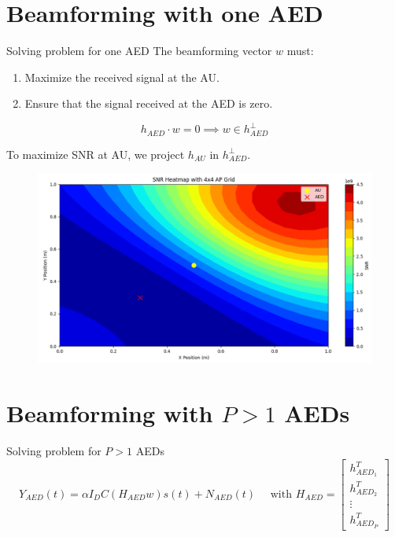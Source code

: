 \documentclass[aspectratio=169,xcolor=dvipsnames]{beamer}
\begin{document}
	\section{Beamforming with one AED}
	
	\begin{frame}{Solving problem for one AED}
		The beamforming vector \( w \) must:
		\begin{enumerate}
			\item Maximize the received signal at the AU.
			\item Ensure that the signal received at the AED is zero.
		\end{enumerate}
		
		\begin{equation}
			h_{AED} \cdot w = 0 \implies w \in h_{AED}^\perp
		\end{equation}
		
		To maximize SNR at AU, we project $h_{AU}$ in $h_{AED}^\perp$.
		
		\begin{figure}[h!]
			\centering
			\includegraphics[width=.5\textwidth]{../../oneAED.PNG}
		\end{figure}
	\end{frame}
	
	\section{Beamforming with $P>1$ AEDs}
	
	\begin{frame}{Solving problem for $P > 1$ AEDs}
		\begin{equation}
			Y_{AED}(t) = \alpha I_DC (H_{AED} w) s(t) + N_{AED}(t) \quad \text{ with } H_{AED} =
			\begin{bmatrix}
				h_{AED_1}^T \\
				h_{AED_2}^T \\
				\vdots \\
				h_{AED_P}^T
			\end{bmatrix} 
		\end{equation}
		\begin{figure}[h!]
			\centering
			\hfill
		\end{figure}
	\end{frame}
	
\end{document}

